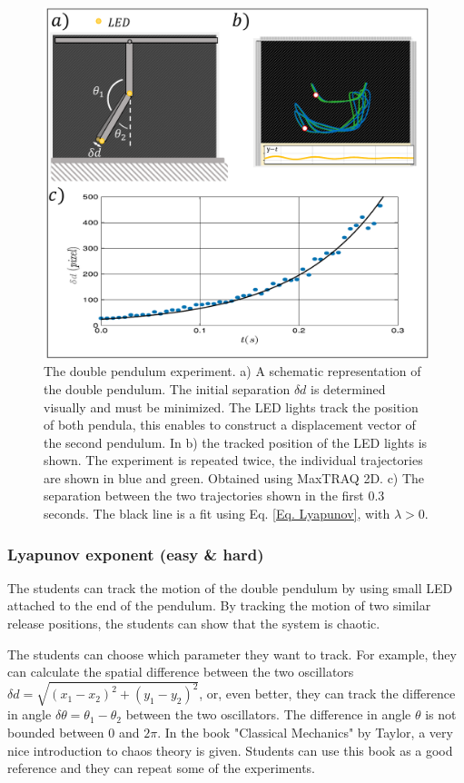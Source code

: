\documentclass{article}
\begin{document}
\begin{figure}[H]
    \centering
    \includegraphics[width = 12cm]{figures/Lyapunov.pdf}
    \caption{The double pendulum experiment. a) A schematic representation of the double pendulum. The initial separation $\delta d$ is determined visually and must be minimized. The LED lights track the position of both pendula, this enables to construct a displacement vector of the second pendulum. In b) the tracked position of the LED lights is shown. The experiment is repeated twice, the individual trajectories are shown in blue and green. Obtained using MaxTRAQ 2D. c) The separation between the two trajectories shown in the first 0.3 seconds. The black line is a fit using Eq. \ref{Eq. Lyapunov}, with $\lambda > 0$. }
    \label{Fig. Lyapunov}
\end{figure}

\subsubsection{Lyapunov exponent (easy \& hard)}
The students can track the motion of the double pendulum by using small LED attached to the end of the pendulum. By tracking the motion of two similar release positions, the students can show that the system is chaotic.

The students can choose which parameter they want to track. For example, they can calculate the spatial difference between the two oscillators $\delta d = \sqrt{(x_1-x_2)^2+(y_1-y_2)^2}$, or, even better, they can track the difference in angle $\delta \theta = \theta_1-\theta_2$ between the two oscillators. The difference in angle $\theta$ is not bounded between $0$ and $2\pi$. In the book "Classical Mechanics" by Taylor, a very nice introduction to chaos theory is given. Students can use this book as a good reference and they can repeat some of the experiments.
\newpage
\end{document}
